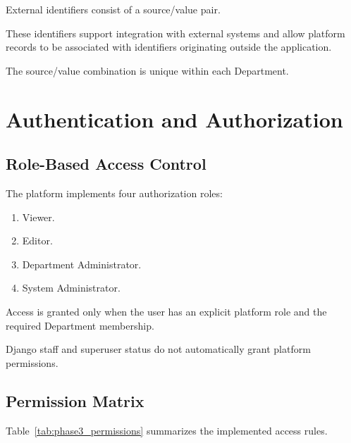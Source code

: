 \documentclass[11pt,a4paper]{article}
\begin{document}
External identifiers consist of a source/value pair.

These identifiers support integration with external
systems and allow platform records to be associated
with identifiers originating outside the application.

The source/value combination is unique within
each Department.


\section{Authentication and Authorization}

\subsection{Role-Based Access Control}

The platform implements four authorization roles:

\begin{enumerate}
    \item Viewer.
    \item Editor.
    \item Department Administrator.
    \item System Administrator.
\end{enumerate}

Access is granted only when the user has an
explicit platform role and the required
Department membership.

Django staff and superuser status do not
automatically grant platform permissions.

\subsection{Permission Matrix}

Table~\ref{tab:phase3_permissions} summarizes
the implemented access rules.
\end{document}
